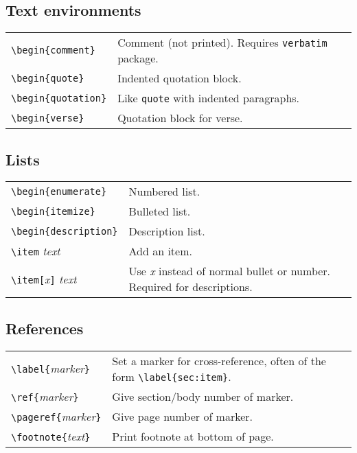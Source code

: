 \subsection{Text environments}
\begin{tabular}{@{}p{\the\MyLen}%
                @{}p{\linewidth-\the\MyLen}@{}}
\verb!\begin{comment}!    &  Comment (not printed). Requires \texttt{verbatim} package. \\
\verb!\begin{quote}!      &  Indented quotation block. \\
\verb!\begin{quotation}!  &  Like \texttt{quote} with indented paragraphs. \\
\verb!\begin{verse}!      &  Quotation block for verse.
\end{tabular}

\subsection{Lists}
\begin{tabular}{@{}p{\the\MyLen}%
                @{}p{\linewidth-\the\MyLen}@{}}
\verb!\begin{enumerate}!        &  Numbered list. \\
\verb!\begin{itemize}!          &  Bulleted list. \\
\verb!\begin{description}!      &  Description list. \\
\verb!\item! \textit{text}      &  Add an item. \\
\verb!\item[!\textit{x}\verb!]! \textit{text}
                                &  Use \textit{x} instead of normal
                        bullet or number.  Required for descriptions. \\
\end{tabular}




\subsection{References}
\begin{tabular}{@{}p{\the\MyLen}%
                @{}p{\linewidth-\the\MyLen}@{}}
\verb!\label{!\textit{marker}\verb!}!   &  Set a marker for cross-reference, 
                          often of the form \verb!\label{sec:item}!. \\
\verb!\ref{!\textit{marker}\verb!}!   &  Give section/body number of marker. \\
\verb!\pageref{!\textit{marker}\verb!}! &  Give page number of marker. \\
\verb!\footnote{!\textit{text}\verb!}!  &  Print footnote at bottom of page. \\
\end{tabular}



